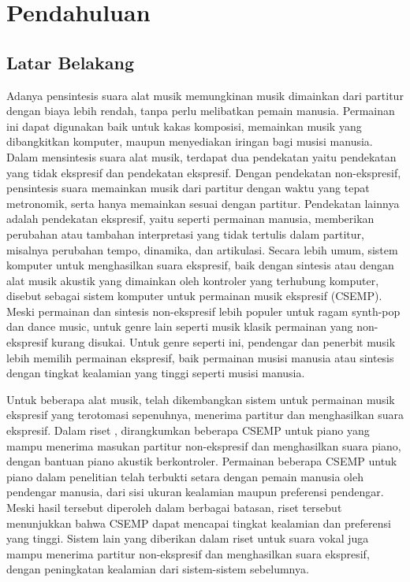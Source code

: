 \chapter{Pendahuluan}

\section{Latar Belakang}

Adanya pensintesis suara alat musik memungkinan musik dimainkan dari partitur dengan biaya lebih rendah, tanpa perlu melibatkan pemain manusia. Permainan ini dapat digunakan baik untuk kakas komposisi, memainkan musik yang dibangkitkan komputer, maupun menyediakan iringan bagi musisi manusia. Dalam mensintesis suara alat musik, terdapat dua pendekatan yaitu pendekatan yang tidak ekspresif dan pendekatan ekspresif. Dengan pendekatan non-ekspresif, pensintesis suara memainkan musik dari partitur dengan waktu yang tepat metronomik, serta hanya memainkan sesuai dengan partitur. Pendekatan lainnya adalah pendekatan ekspresif, yaitu seperti permainan manusia, memberikan perubahan atau tambahan interpretasi yang tidak tertulis dalam partitur, misalnya perubahan tempo, dinamika, dan artikulasi. Secara lebih umum, sistem komputer untuk menghasilkan suara ekspresif, baik dengan sintesis atau dengan alat musik akustik yang dimainkan oleh kontroler yang terhubung komputer, disebut sebagai sistem komputer untuk permainan musik ekspresif (CSEMP). Meski permainan dan sintesis non-ekspresif lebih populer untuk ragam synth-pop dan dance music, untuk genre lain seperti musik klasik permainan yang non-ekspresif kurang disukai. Untuk genre seperti ini, pendengar dan penerbit musik lebih memilih permainan ekspresif, baik permainan musisi manusia atau sintesis dengan tingkat kealamian yang tinggi seperti musisi manusia.\parencite{Kirke:2009:SCS:1592451.1592454}

Untuk beberapa alat musik, telah dikembangkan sistem untuk permainan musik ekspresif yang terotomasi sepenuhnya, menerima partitur dan menghasilkan suara ekspresif. Dalam riset \citet{schubert2017test}, dirangkumkan beberapa CSEMP untuk piano yang mampu menerima masukan partitur non-ekspresif dan menghasilkan suara piano, dengan bantuan piano akustik berkontroler. Permainan beberapa CSEMP untuk piano dalam penelitian \citet{schubert2017test} telah terbukti setara dengan pemain manusia oleh pendengar manusia, dari sisi ukuran kealamian maupun preferensi pendengar. Meski hasil tersebut diperoleh dalam berbagai batasan, riset tersebut menunjukkan bahwa CSEMP dapat mencapai tingkat kealamian dan preferensi yang tinggi. Sistem lain yang diberikan dalam riset \citet{bonada2017singing} untuk suara vokal juga mampu menerima partitur non-ekspresif dan menghasilkan suara ekspresif, dengan peningkatan kealamian dari sistem-sistem sebelumnya.

